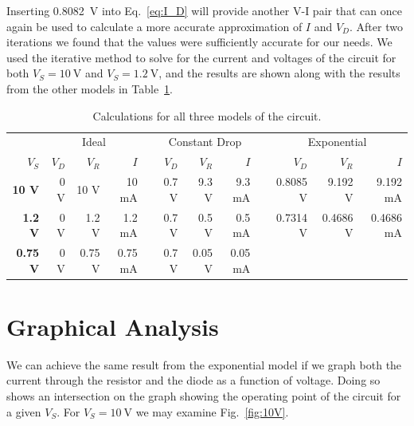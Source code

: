 \documentclass{../../ece-report}
\newcommand{\ra}[1]{\renewcommand{\arraystretch}{#1}}
\begin{document}
Inserting 0.8082~\si{\V} into Eq.~\ref{eq:I_D} will
provide another V-I pair that can once again be used
to calculate a more accurate approximation of $I$ and
$V_D$. After two iterations we found that the values
were sufficiently accurate for our needs. We used the iterative
method to solve for the current and voltages of the circuit for 
both $V_S = 10~\si{\V}$ and $V_S = 1.2~\si{\V}$, and the results
are shown along with the results from the other models in Table~\ref{tab:calculations}.


\begin{table}[h!]
  \centering
  \begin{tabular}{rrrrcrrrcrrr}\toprule
    & \multicolumn{3}{c}{Ideal}  & \phantom{abc} & \multicolumn{3}{c}{Constant Drop} & \phantom{abc} & \multicolumn{3}{c}{Exponential} \\

    \cmidrule(lr){2-4} \cmidrule(lr){6-8} \cmidrule(lr){10-12}
    $V_S$            & $V_D$ & $V_R$ & $I$      & & $V_D$  & $V_R$  & $I$     & & $V_D$    & $V_R$    & $I$       \\ \midrule
    \textbf{10 V}    & 0 V   & 10   V & 10   mA & & 0.7  V & 9.3  V & 9.3  mA & & 0.8085 V & 9.192  V & 9.192  mA \\
    \textbf{1.2 V}   & 0 V   & 1.2  V & 1.2  mA & & 0.7  V & 0.5  V & 0.5  mA & & 0.7314 V & 0.4686 V & 0.4686 mA \\
    \textbf{0.75 V}  & 0 V   & 0.75 V & 0.75 mA & & 0.7  V & 0.05 V & 0.05 mA & &          &          &           \\
    
  \bottomrule
  \end{tabular}
  \caption{Calculations for all three models of the circuit.}
  \label{tab:calculations}
\end{table}


\section{Graphical Analysis}

We can achieve the same result from the exponential
model if we graph both the current through the resistor
and the diode as a function of voltage. Doing so shows
an intersection on the graph showing the operating point
of the circuit for a given $V_S$. For $V_S = 10~\si{\V}$
we may examine Fig.~\ref{fig:10V}.
\end{document}

